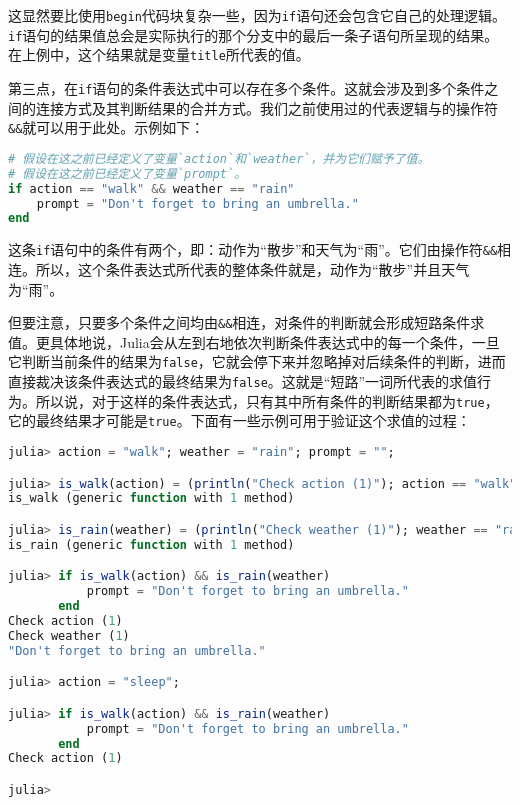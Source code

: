 这显然要比使用\verb`begin`代码块复杂一些，因为\verb`if`语句还会包含它自己的处理逻辑。\verb`if`语句的结果值总会是实际执行的那个分支中的最后一条子语句所呈现的结果。在上例中，这个结果就是变量\verb`title`所代表的值。

第三点，在\verb`if`语句的条件表达式中可以存在多个条件。这就会涉及到多个条件之间的连接方式及其判断结果的合并方式。我们之前使用过的代表逻辑与的操作符\verb`&&`就可以用于此处。示例如下：

\begin{lstlisting}[language=julia]
# 假设在这之前已经定义了变量`action`和`weather`，并为它们赋予了值。
# 假设在这之前已经定义了变量`prompt`。
if action == "walk" && weather == "rain"
    prompt = "Don't forget to bring an umbrella."
end
\end{lstlisting}

这条\verb`if`语句中的条件有两个，即：动作为“散步”和天气为“雨”。它们由操作符\verb`&&`相连。所以，这个条件表达式所代表的整体条件就是，动作为“散步”并且天气为“雨”。

但要注意，只要多个条件之间均由\verb`&&`相连，对条件的判断就会形成短路条件求值。更具体地说，Julia会从左到右地依次判断条件表达式中的每一个条件，一旦它判断当前条件的结果为\verb`false`，它就会停下来并忽略掉对后续条件的判断，进而直接裁决该条件表达式的最终结果为\verb`false`。这就是“短路”一词所代表的求值行为。所以说，对于这样的条件表达式，只有其中所有条件的判断结果都为\verb`true`，它的最终结果才可能是\verb`true`。下面有一些示例可用于验证这个求值的过程：

\begin{lstlisting}[language=julia]
julia> action = "walk"; weather = "rain"; prompt = "";

julia> is_walk(action) = (println("Check action (1)"); action == "walk")
is_walk (generic function with 1 method)

julia> is_rain(weather) = (println("Check weather (1)"); weather == "rain")
is_rain (generic function with 1 method)

julia> if is_walk(action) && is_rain(weather)
           prompt = "Don't forget to bring an umbrella."
       end
Check action (1)
Check weather (1)
"Don't forget to bring an umbrella."

julia> action = "sleep";

julia> if is_walk(action) && is_rain(weather)
           prompt = "Don't forget to bring an umbrella."
       end
Check action (1)

julia> 
\end{lstlisting}

